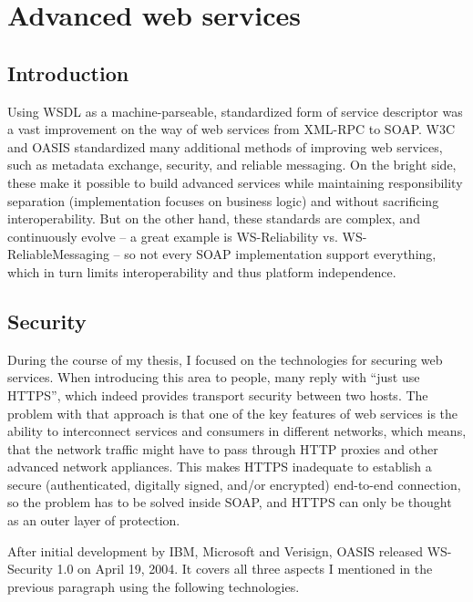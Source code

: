 \section{Advanced web services}

\subsection{Introduction}

Using WSDL as a machine-parseable, standardized form of service descriptor was a vast improvement on the way of web services from XML-RPC to SOAP. W3C and OASIS standardized many additional methods of improving web services, such as metadata exchange, security, and reliable messaging. On the bright side, these make it possible to build advanced services while maintaining responsibility separation (implementation focuses on business logic) and without sacrificing interoperability. But on the other hand, these standards are complex, and continuously evolve -- a great example is WS-Reliability vs. WS-ReliableMessaging -- so not every SOAP implementation support everything, which in turn limits interoperability and thus platform independence.

\subsection{Security}

During the course of my thesis, I focused on the technologies for securing web services. When introducing this area to people, many reply with ``just use HTTPS'', which indeed provides transport security between two hosts. The problem with that approach is that one of the key features of web services is the ability to interconnect services and consumers in different networks, which means, that the network traffic might have to pass through HTTP proxies and other advanced network appliances. This makes HTTPS inadequate to establish a secure (authenticated, digitally signed, and/or encrypted) end-to-end connection, so the problem has to be solved inside SOAP, and HTTPS can only be thought as an outer layer of protection.

After initial development by IBM, Microsoft and Verisign, OASIS released WS\hyp{}Security 1.0 on April 19, 2004. It covers all three aspects I mentioned in the previous paragraph using the following technologies.

